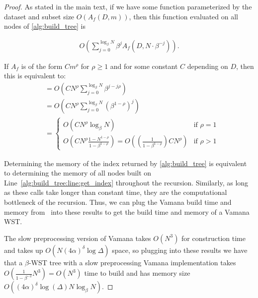 \documentclass{article}
\theoremstyle{plain}
\theoremstyle{definition}
\theoremstyle{remark}
\begin{document}
\existingannmemory
\begin{proof}

As stated in the main text, if we have some function parameterized by the dataset and subset size $O(A_f(D, m))$, then this function evaluated on all nodes of \cref{alg:build_tree} is

\begin{align}
\label{eqn:helpful}
O \left( \sum_{j = 0}^{\log_\beta N} \beta^j A_f(D, N \cdot \beta^{-j})\right).    
\end{align}


If $A_f$ is of the form $Cm^\rho$ for $\rho \ge 1$ and for some constant $C$ depending on $D$, then this is equivalent to:
\begin{align*}
    &=  O \left( CN^\rho \sum_{j = 0}^{\log_\beta N} \beta^{j - j\rho} \right)\\
    &= O \left( CN^\rho \sum_{j = 0}^{\log_\beta N} (\beta^{1 - \rho})^j \right)\\
    &= \begin{cases} 
    O(CN^\rho \log_{\beta}N) &\text{if $\rho = 1$}\\
    O \left( CN^\rho \frac{1 - N^{1 - \rho}}{1 - \beta^{1 - \rho}} \right) = O((\frac{1}{1 - \beta^{1 - \rho}} ) CN^\rho) &\text{if $\rho > 1$}
        \end{cases}
\end{align*}


Determining the memory of the index returned by \cref{alg:build_tree} is equivalent to determining the memory of all nodes built on Line~\ref{alg:build_tree:line:get_index} throughout the recursion. Similarly, as long as these calls take longer than constant time, they are the computational bottleneck of the recursion. Thus, we can plug the Vamana build time and memory from~\cite{indyk2023worst} into these results to get the build time and memory of a Vamana WST.

The slow preprocessing version of Vamana takes $O(N^3)$ for construction time and takes up $O(N (4\alpha)^\delta \log \Delta)$ space, so plugging into these results we have that a $\beta$-WST tree with a slow preprocessing Vamana implementation takes $O(\frac{1}{1 - \beta^{-2}} N^3) = O(N^3)$ time to build and has memory size $O((4\alpha)^\delta \log (\Delta) N \log_{\beta} N)$.    
\end{proof}
\end{document}
